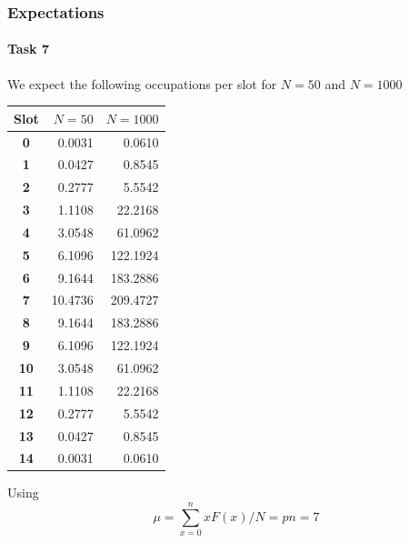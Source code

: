 \documentclass{scrreprt}
\begin{document}
\subsubsection{Expectations}
\paragraph*{Task 7}

We expect the following occupations per slot for $N=50$ and $N=1000$

\begin{table}[H]
  \centering
    \begin{tabular}{|l|rr|}
    \hline
    \multicolumn{1}{|r}{\textbf{Slot}} & $N=50$ & $N=1000$ \\
    \hline
    \multicolumn{1}{|c|}{\textbf{0}} & 0.0031 & 0.0610 \\
    \multicolumn{1}{|c|}{\textbf{1}} & 0.0427 & 0.8545 \\
    \multicolumn{1}{|c|}{\textbf{2}} & 0.2777 & 5.5542 \\
    \multicolumn{1}{|c|}{\textbf{3}} & 1.1108 & 22.2168 \\
    \multicolumn{1}{|c|}{\textbf{4}} & 3.0548 & 61.0962 \\
    \multicolumn{1}{|c|}{\textbf{5}} & 6.1096 & 122.1924 \\
    \multicolumn{1}{|c|}{\textbf{6}} & 9.1644 & 183.2886 \\
    \multicolumn{1}{|c|}{\textbf{7}} & 10.4736 & 209.4727 \\
    \multicolumn{1}{|c|}{\textbf{8}} & 9.1644 & 183.2886 \\
    \multicolumn{1}{|c|}{\textbf{9}} & 6.1096 & 122.1924 \\
    \multicolumn{1}{|c|}{\textbf{10}} & 3.0548 & 61.0962 \\
    \multicolumn{1}{|c|}{\textbf{11}} & 1.1108 & 22.2168 \\
    \multicolumn{1}{|c|}{\textbf{12}} & 0.2777 & 5.5542 \\
    \multicolumn{1}{|c|}{\textbf{13}} & 0.0427 & 0.8545 \\
    \multicolumn{1}{|c|}{\textbf{14}} & 0.0031 & 0.0610 \\
    \hline
    \end{tabular}%
\end{table}%

Using 
\begin{equation}
\mu = \sum_{x=0}^n{x F(x)}/N = p n = 7
\end{equation}
\end{document}
